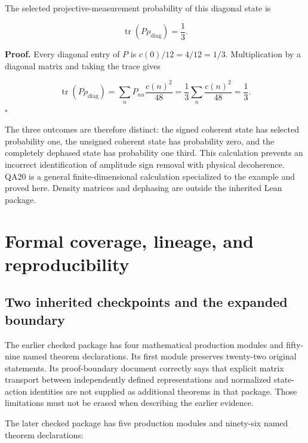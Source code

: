 The selected projective-measurement probability of this diagonal state
is

\[
\operatorname{tr}(P\rho_{\mathrm{diag}})=\frac13.
\]

\textbf{Proof.} Every diagonal entry of \(P\) is \(c(0)/12=4/12=1/3\).
Multiplication by a diagonal matrix and taking the trace gives

\[
\operatorname{tr}(P\rho_{\mathrm{diag}})
=\sum_n P_{nn}\frac{c(n)^2}{48}
=\frac13\sum_n\frac{c(n)^2}{48}
=\frac13.
\] \(\square\)

The three outcomes are therefore distinct: the signed coherent state has
selected probability one, the unsigned coherent state has probability
zero, and the completely dephased state has probability one third. This
calculation prevents an incorrect identification of amplitude sign
removal with physical decoherence. QA20 is a general finite-dimensional
calculation specialized to the example and proved here. Density matrices
and dephasing are outside the inherited Lean package.

\hypertarget{formal-coverage-lineage-and-reproducibility}{%
\section{Formal coverage, lineage, and
reproducibility}\label{formal-coverage-lineage-and-reproducibility}}

\hypertarget{two-inherited-checkpoints-and-the-expanded-boundary}{%
\subsection{Two inherited checkpoints and the expanded
boundary}\label{two-inherited-checkpoints-and-the-expanded-boundary}}

The earlier checked package has four mathematical production modules and
fifty-nine named theorem declarations. Its first module preserves
twenty-two original statements. Its proof-boundary document correctly
says that explicit matrix transport between independently defined
representations and normalized state-action identities are not supplied
as additional theorems in that package. Those limitations must not be
erased when describing the earlier evidence.

The later checked package has five production modules and ninety-six
named theorem declarations:

